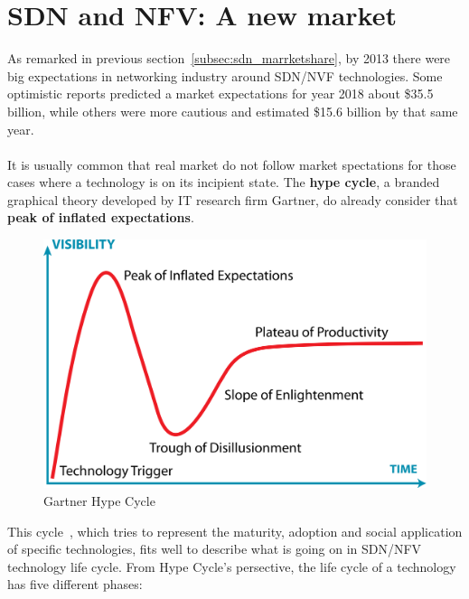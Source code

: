 \documentclass[a4paper, 12pt]{book}
\begin{document}
\section{SDN and NFV: A new market}
\label{sec:odlnewmarket}

As remarked in previous section~\ref{subsec:sdn_marrketshare}, by 2013 there were big expectations in networking industry around SDN/NVF technologies. Some optimistic reports predicted a market expectations for year 2018 about \$35.5 billion, while others were more cautious and estimated \$15.6 billion by that same year.\\
\\
It is usually common that real market do not follow market spectations for those cases where a technology is on its incipient state. The \textbf{hype cycle}, a branded graphical theory developed by IT research firm Gartner, do already consider that \textbf{peak of inflated expectations}.
\begin{center}
 \begin{figure}[H]
 \begin{center}
   \includegraphics[width=15cm]{img/hype-cycle-00.png}
   \caption{Gartner Hype Cycle}
   \label{fig:gartner_hype_cyle}
 \end{center}
 \end{figure}
\end{center}

This cycle~\cite{HypeCycle}, which tries to represent the maturity, adoption and social application of specific technologies, fits well to describe what is going on in SDN/NFV technology life cycle. From Hype Cycle's persective, the life cycle of a technology has five different phases:
\end{document}
